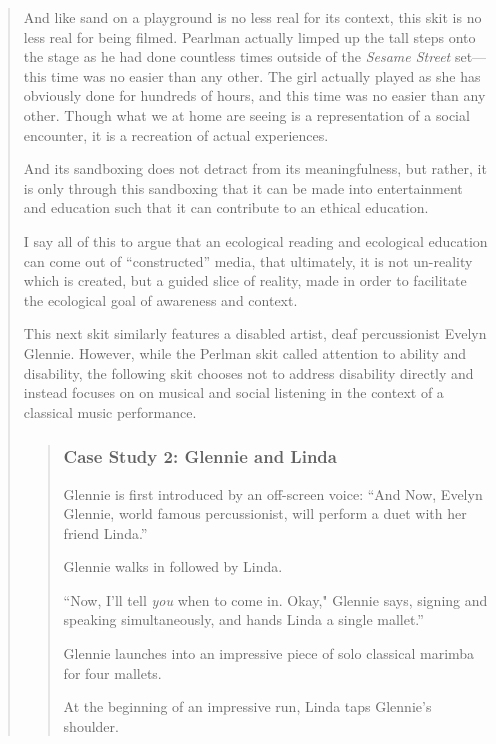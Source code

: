 \documentclass[12pt,letterpaper]{article}
\begin{document}
\begin{quote}
	And like sand on a playground is no less real for its context,
	this skit is no less real for being filmed. Pearlman actually 
	limped up the tall steps onto the stage as he had done countless times 
	outside of the \textit{Sesame Street} set---this time was no easier than
	any other. The girl actually played as she has obviously done for
	hundreds of hours, and this time was no easier than any other. 
	Though what we at home are seeing is a representation of a social 
	encounter, it is a recreation of actual	experiences. 

	And its sandboxing does not detract from its meaningfulness, but rather,
	it is only through this sandboxing that it can be made into 
	entertainment and
	education such that it can contribute to an ethical education. 
	
	I say all of this to argue that an ecological reading and ecological 
	education 
	can come out of ``constructed'' media, that ultimately, it is not 
	un-reality which is created, but a guided slice of reality, made in 
	order to facilitate the ecological goal of awareness and context.  
	
	This next skit similarly features a disabled artist, deaf percussionist 
	Evelyn Glennie. However, while the Perlman skit called attention to
	ability and disability, the following skit chooses not to address 
	disability directly and instead focuses on 
	on musical and social listening in the context of a classical music
	performance. 
	
	\begin{quote}
	
	\subsubsection*{Case Study 2: Glennie and Linda}
	
	Glennie is first introduced by an off-screen voice: ``And Now, Evelyn 
	Glennie, world famous percussionist, will perform a duet with her 
	friend Linda.''

	Glennie walks in followed by Linda.  

	``Now, I'll tell \textit{you} when to come in. Okay," Glennie says, 
	signing and 
	speaking simultaneously, and hands Linda a single mallet.''  

	Glennie launches into an impressive piece of solo classical marimba for 
	four mallets. 

	At the beginning of an impressive run, Linda taps Glennie's shoulder.


\end{quote}
\end{quote}
\end{document}
